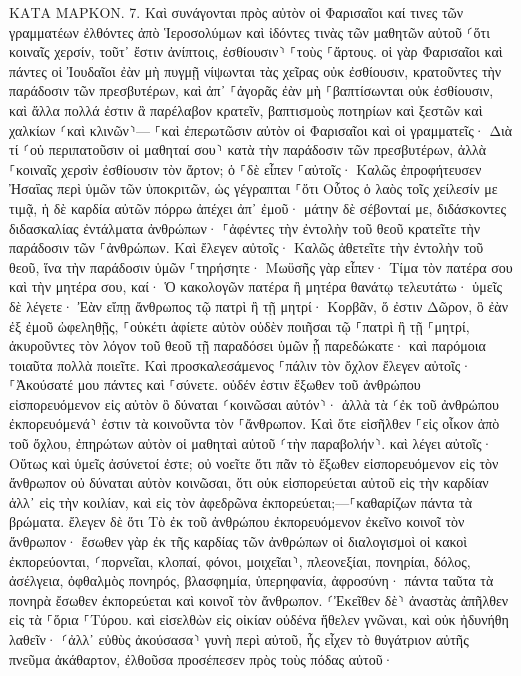 \documentclass[twoside, 9pt]{extreport}
\begin{document}
ΚΑΤΑ ΜΑΡΚΟΝ.
7.
Καὶ συνάγονται πρὸς αὐτὸν οἱ Φαρισαῖοι καί τινες τῶν γραμματέων ἐλθόντες ἀπὸ Ἱεροσολύμων 
καὶ ἰδόντες τινὰς τῶν μαθητῶν αὐτοῦ ⸂ὅτι κοιναῖς χερσίν, τοῦτ᾽ ἔστιν ἀνίπτοις, ἐσθίουσιν⸃ ⸀τοὺς ⸀ἄρτους. 
οἱ γὰρ Φαρισαῖοι καὶ πάντες οἱ Ἰουδαῖοι ἐὰν μὴ πυγμῇ νίψωνται τὰς χεῖρας οὐκ ἐσθίουσιν, κρατοῦντες τὴν παράδοσιν τῶν πρεσβυτέρων, 
καὶ ἀπ᾽ ⸀ἀγορᾶς ἐὰν μὴ ⸀βαπτίσωνται οὐκ ἐσθίουσιν, καὶ ἄλλα πολλά ἐστιν ἃ παρέλαβον κρατεῖν, βαπτισμοὺς ποτηρίων καὶ ξεστῶν καὶ χαλκίων ⸂καὶ κλινῶν⸃— 
⸀καὶ ἐπερωτῶσιν αὐτὸν οἱ Φαρισαῖοι καὶ οἱ γραμματεῖς· Διὰ τί ⸂οὐ περιπατοῦσιν οἱ μαθηταί σου⸃ κατὰ τὴν παράδοσιν τῶν πρεσβυτέρων, ἀλλὰ ⸀κοιναῖς χερσὶν ἐσθίουσιν τὸν ἄρτον; 
ὁ ⸀δὲ εἶπεν ⸀αὐτοῖς· Καλῶς ἐπροφήτευσεν Ἠσαΐας περὶ ὑμῶν τῶν ὑποκριτῶν, ὡς γέγραπται ⸀ὅτι Οὗτος ὁ λαὸς τοῖς χείλεσίν με τιμᾷ, ἡ δὲ καρδία αὐτῶν πόρρω ἀπέχει ἀπ᾽ ἐμοῦ· 
μάτην δὲ σέβονταί με, διδάσκοντες διδασκαλίας ἐντάλματα ἀνθρώπων· 
⸀ἀφέντες τὴν ἐντολὴν τοῦ θεοῦ κρατεῖτε τὴν παράδοσιν τῶν ⸀ἀνθρώπων. 
Καὶ ἔλεγεν αὐτοῖς· Καλῶς ἀθετεῖτε τὴν ἐντολὴν τοῦ θεοῦ, ἵνα τὴν παράδοσιν ὑμῶν ⸀τηρήσητε· 
Μωϋσῆς γὰρ εἶπεν· Τίμα τὸν πατέρα σου καὶ τὴν μητέρα σου, καί· Ὁ κακολογῶν πατέρα ἢ μητέρα θανάτῳ τελευτάτω· 
ὑμεῖς δὲ λέγετε· Ἐὰν εἴπῃ ἄνθρωπος τῷ πατρὶ ἢ τῇ μητρί· Κορβᾶν, ὅ ἐστιν Δῶρον, ὃ ἐὰν ἐξ ἐμοῦ ὠφεληθῇς, 
⸀οὐκέτι ἀφίετε αὐτὸν οὐδὲν ποιῆσαι τῷ ⸀πατρὶ ἢ τῇ ⸀μητρί, 
ἀκυροῦντες τὸν λόγον τοῦ θεοῦ τῇ παραδόσει ὑμῶν ᾗ παρεδώκατε· καὶ παρόμοια τοιαῦτα πολλὰ ποιεῖτε. 
Καὶ προσκαλεσάμενος ⸀πάλιν τὸν ὄχλον ἔλεγεν αὐτοῖς· ⸀Ἀκούσατέ μου πάντες καὶ ⸀σύνετε. 
οὐδέν ἐστιν ἔξωθεν τοῦ ἀνθρώπου εἰσπορευόμενον εἰς αὐτὸν ὃ δύναται ⸂κοινῶσαι αὐτόν⸃· ἀλλὰ τὰ ⸂ἐκ τοῦ ἀνθρώπου ἐκπορευόμενά⸃ ἐστιν τὰ κοινοῦντα τὸν ⸀ἄνθρωπον. 
Καὶ ὅτε εἰσῆλθεν ⸀εἰς οἶκον ἀπὸ τοῦ ὄχλου, ἐπηρώτων αὐτὸν οἱ μαθηταὶ αὐτοῦ ⸂τὴν παραβολήν⸃. 
καὶ λέγει αὐτοῖς· Οὕτως καὶ ὑμεῖς ἀσύνετοί ἐστε; οὐ νοεῖτε ὅτι πᾶν τὸ ἔξωθεν εἰσπορευόμενον εἰς τὸν ἄνθρωπον οὐ δύναται αὐτὸν κοινῶσαι, 
ὅτι οὐκ εἰσπορεύεται αὐτοῦ εἰς τὴν καρδίαν ἀλλ᾽ εἰς τὴν κοιλίαν, καὶ εἰς τὸν ἀφεδρῶνα ἐκπορεύεται;—⸀καθαρίζων πάντα τὰ βρώματα. 
ἔλεγεν δὲ ὅτι Τὸ ἐκ τοῦ ἀνθρώπου ἐκπορευόμενον ἐκεῖνο κοινοῖ τὸν ἄνθρωπον· 
ἔσωθεν γὰρ ἐκ τῆς καρδίας τῶν ἀνθρώπων οἱ διαλογισμοὶ οἱ κακοὶ ἐκπορεύονται, ⸂πορνεῖαι, κλοπαί, φόνοι, 
μοιχεῖαι⸃, πλεονεξίαι, πονηρίαι, δόλος, ἀσέλγεια, ὀφθαλμὸς πονηρός, βλασφημία, ὑπερηφανία, ἀφροσύνη· 
πάντα ταῦτα τὰ πονηρὰ ἔσωθεν ἐκπορεύεται καὶ κοινοῖ τὸν ἄνθρωπον. 
⸂Ἐκεῖθεν δὲ⸃ ἀναστὰς ἀπῆλθεν εἰς τὰ ⸀ὅρια ⸀Τύρου. καὶ εἰσελθὼν εἰς οἰκίαν οὐδένα ἤθελεν γνῶναι, καὶ οὐκ ἠδυνήθη λαθεῖν· 
⸂ἀλλ᾽ εὐθὺς ἀκούσασα⸃ γυνὴ περὶ αὐτοῦ, ἧς εἶχεν τὸ θυγάτριον αὐτῆς πνεῦμα ἀκάθαρτον, ἐλθοῦσα προσέπεσεν πρὸς τοὺς πόδας αὐτοῦ· 
\end{document}
